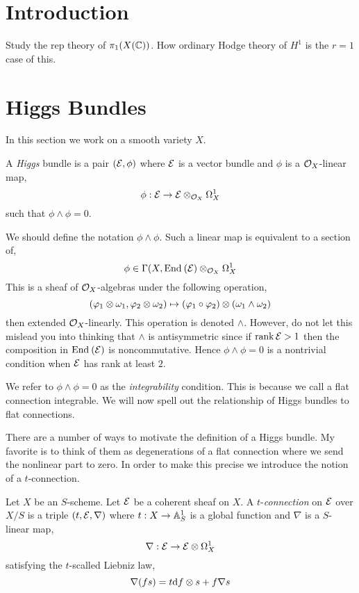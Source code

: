 \documentclass[12pt]{article}
\begin{document}
\section{Introduction}

Study the rep theory of $\pi_1(X(\mathbb{C}))$. How ordinary Hodge theory of $H^1$ is the $r = 1$ case of this.

\section{Higgs Bundles}

In this section we work on a smooth variety $X$.

\begin{defn}
A \textit{Higgs} bundle is a pair $(\mathcal{E}, \phi)$ where $\mathcal{E}$ is a vector bundle and $\phi$ is a $\mathcal{O}_{X}$-linear map,
\[ \phi : \mathcal{E} \to \mathcal{E} \otimes_{\mathcal{O}_{X}} \Omega_X^1 \]
such that $\phi \wedge \phi = 0$.
\end{defn}

\begin{rmk}
We should define the notation $\phi \wedge \phi$. Such a linear map is equivalent to a section of,
\[ \phi \in \Gamma(X, \mathrm{End}_{} \left( \mathcal{E} \right) \otimes_{\mathcal{O}_{X}} \Omega^1_X \]
This is a sheaf of $\mathcal{O}_{X}$-algebras under the following operation,
\[ (\varphi_1 \otimes \omega_1, \varphi_2 \otimes \omega_2) \mapsto (\varphi_1 \circ \varphi_2) \otimes (\omega_1 \wedge \omega_2) \]
then extended $\mathcal{O}_{X}$-linearly. This operation is denoted $\wedge$. However, do not let this mislead you into thinking that $\wedge$ is antisymmetric since if $\operatorname{\mathrm{rank}}{\mathcal{E}} > 1$ then the composition in $\mathrm{End}_{} \left( \mathcal{E} \right)$ is noncommutative. Hence $\phi \wedge \phi = 0$ is a nontrivial condition when $\mathcal{E}$ has rank at least $2$.
\end{rmk}

\begin{rmk}
We refer to $\phi \wedge \phi = 0$ as the \textit{integrability} condition. This is because we call a flat connection integrable. We will now spell out the relationship of Higgs bundles to flat connections. 
\end{rmk}

There are a number of ways to motivate the definition of a Higgs bundle. My favorite is to think of them as degenerations of a flat connection where we send the nonlinear part to zero. In order to make this precise we introduce the notion of a $t$-connection.

\begin{defn}
Let $X$ be an $S$-scheme. Let $\mathcal{E}$ be a coherent sheaf on $X$. A $t$-\textit{connection} on $\mathcal{E}$ over $X/S$ is a triple $(t, \mathcal{E}, \nabla)$ where $t : X \to \mathbb{A}^1_S$ is a global function and $\nabla$ is a $S$-linear map,
\[ \nabla : \mathcal{E} \to \mathcal{E} \otimes \Omega^1_X \]
satisfying the $t$-scalled Liebniz law,
\[ \nabla(f s) = t \mathrm{d}{f} \otimes s + f \nabla s \] 
\end{defn}
\end{document}
